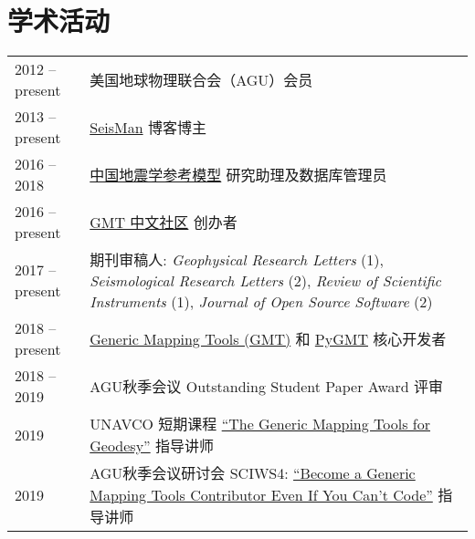 \section*{学术活动}

\newcommand{\tabitem}{~~\llap{\textbullet}~~}

\begin{tabular}{p{} p{}}
2012 -- present & 美国地球物理联合会（AGU）会员 \\
2013 -- present & \href{https://blog.seisman.info}{SeisMan} 博客博主 \\
2016 -- 2018    & \href{http://chinageorefmodel.org/}{中国地震学参考模型} 研究助理及数据库管理员 \\
2016 -- present & \href{http://gmt-china.org/}{GMT 中文社区} 创办者 \\
2017 -- present & 期刊审稿人:
                  \textit{Geophysical Research Letters} (1),
                  \textit{Seismological Research Letters} (2),
                  \textit{Review of Scientific Instruments} (1),
                  \textit{Journal of Open Source Software} (2) \\
2018 -- present & \href{https://github.com/GenericMappingTools/gmt}{Generic Mapping Tools (GMT)} 和 \href{https://github.com/GenericMappingTools/pygmt}{PyGMT} 核心开发者 \\
2018 -- 2019 & AGU秋季会议 Outstanding Student Paper Award 评审 \\
2019 & UNAVCO 短期课程 \href{https://www.unavco.org/education/professional-development/short-courses/2019/geodetic-gmt/geodetic-gmt.html}{``The Generic Mapping Tools for Geodesy''} 指导讲师 \\
2019 & AGU秋季会议研讨会 SCIWS4: \href{https://www.agu.org/Events/SCIWS4-Generic-Mapping-Tools}{``Become a Generic Mapping Tools Contributor Even If You Can't Code''} 指导讲师 \\
\end{tabular}
